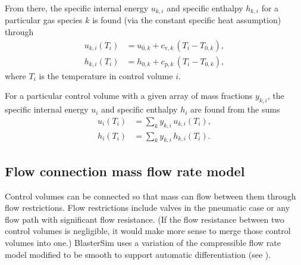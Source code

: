 From there, the specific internal energy $u_{k,i}$ and specific enthalpy $h_{k,i}$ for a particular gas species $k$ is found (via the constant specific heat assumption) through
\begin{align}
    u_{k,i}(T_i) &= u_{0,k} + c_{\text{v},k} \, (T_i - T_{0,k}),\label{eq:species specific internal energy} \\
    h_{k,i}(T_i) &= h_{0,k} + c_{\text{p},k} \, (T_i - T_{0,k}),\label{eq:species specific enthalpy}
\end{align}
where $T_i$ is the temperature in control volume $i$.

For a particular control volume with a given array of mass fractions $y_{k,i}$, the specific internal energy $u_i$ and specific enthalpy $h_i$ are found from the sums
\begin{align}
    u_i(T_i) &= \sum_k y_{k,i} \, u_{k,i}(T_i),\label{eq:specific internal energy} \\
    h_i(T_i) &= \sum_k y_{k,i} \, h_{k,i}(T_i).\label{eq:specific enthalpy}
\end{align}


\subsection{Flow connection mass flow rate model}\label{mass-flow-rate}

Control volumes can be connected so that mass can flow between them through flow restrictions.
Flow restrictions include valves in the pneumatic case or any flow path with significant flow resistance.
(If the flow resistance between two control volumes is negligible, it would make more sense to merge those control volumes into one.)
BlasterSim uses a variation of the \citet[eq.~5.4, p.~46]{beater_pneumatic_2007} compressible flow rate model modified to be smooth to support automatic differentiation (see ).

